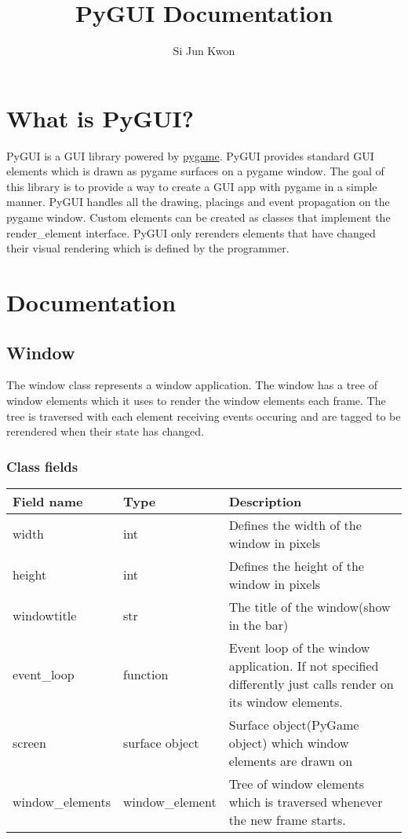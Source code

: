 \documentclass{scrartcl}
\title{PyGUI Documentation}
\author{Si Jun Kwon}
\date{\displaydate{date}}
\begin{document}
    \maketitle
    \newpage
    \tableofcontents
    \newpage
    \section{What is PyGUI?}
    PyGUI is a GUI library powered by \href{https://www.pygame.org/}{pygame}. PyGUI provides
    standard GUI elements which is drawn as pygame surfaces on a pygame window. The goal of this library
    is to provide a way to create a GUI app with pygame in a simple manner. PyGUI handles all the drawing,
    placings and event propagation on the pygame window. Custom elements can be created as classes that
    implement the render\_element interface. PyGUI only rerenders elements that have changed their visual 
    rendering which is defined by the programmer.
    \section{Documentation}
    \subsection{Window}
    The window class represents a window application. The window has a tree of window elements which
    it uses to render the window elements each frame. The tree is traversed with each element receiving
    events occuring and are tagged to be rerendered when their state has changed.
    \subsubsection{Class fields}
    \begin{tabular}{|p{}|p{}|p{}|}
        \hline
        Field name & Type & Description\\
        \hline
        width & int & Defines the width of the window in pixels\\
        \hline
        height & int & Defines the height of the window in pixels\\
        \hline
        windowtitle & str & The title of the window(show in the bar)\\
        \hline
        event\_loop & function & Event loop of the window application. If not specified differently just calls render on its window elements.\\
        \hline
        screen & surface object & Surface object(PyGame object) which window elements are drawn on\\
        \hline
        window\_elements & window\_element& Tree of window elements which is traversed whenever the new frame starts.\\
        \hline
    \end{tabular}
\end{document}
